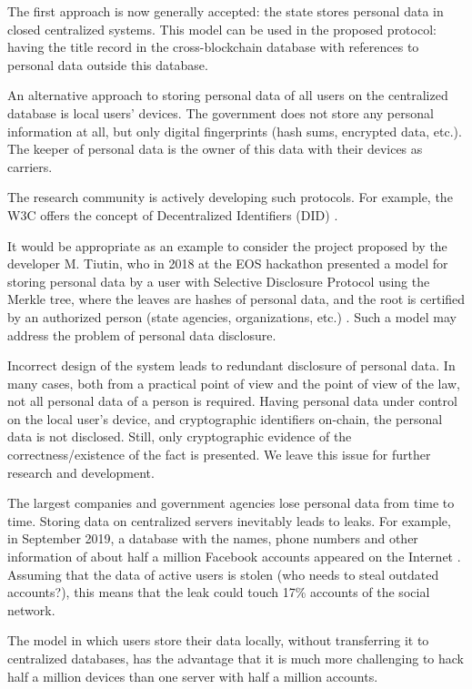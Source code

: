 \begin{multicols}{2}
The first approach is now generally accepted: the state stores personal data in closed centralized systems. This model can be used in the proposed protocol: having the title record in the cross-blockchain database with references to personal data outside this database.

An alternative approach to storing personal data of all users on the centralized database is local users’ devices. The government does not store any personal information at all, but only digital fingerprints (hash sums, encrypted data, etc.). The keeper of personal data is the owner of this data with their devices as carriers.

The research community is actively developing such protocols. For example, the W3C offers the concept of Decentralized Identifiers (DID) \cite{art1-key48}.

It would be appropriate as an example to consider the project proposed by the developer M. Tiutin, who in 2018 at the EOS hackathon presented a model for storing personal data by a user with Selective Disclosure Protocol using the Merkle tree, where the leaves are hashes of personal data, and the root is certified by an authorized person (state agencies, organizations, etc.) \cite{art1-key49}. Such a model may address the problem of personal data disclosure.

Incorrect design of the system leads to redundant disclosure of personal data. In many cases, both from a practical point of view and the point of view of the law, not all personal data of a person is required. Having personal data under control on the local user’s device, and cryptographic identifiers on-chain, the personal data is not disclosed. Still, only cryptographic evidence of the correctness/existence of the fact is presented. We leave this issue for further research and development.

The largest companies and government agencies lose personal data from time to time. Storing data on centralized servers inevitably leads to leaks. For example, in September 2019, a database with the names, phone numbers and other information of about half a million Facebook accounts appeared on the Internet \cite{art1-key50}. Assuming that the data of active users \cite{art1-key51} is stolen (who needs to steal outdated accounts?), this means that the leak could touch 17\% accounts of the social network.

The model in which users store their data locally, without transferring it to centralized databases, has the advantage that it is much more challenging to hack half a million devices than one server with half a million accounts.


\end{multicols}

